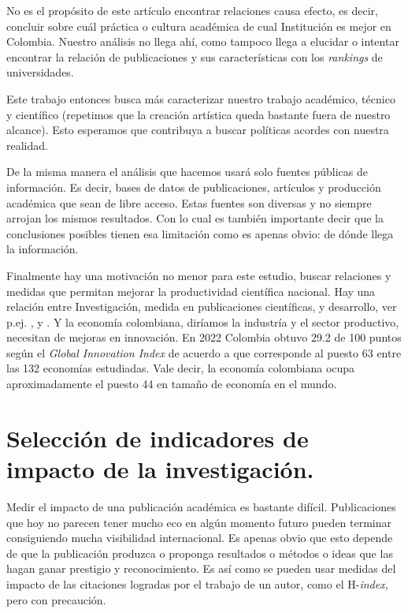 \documentclass[
11pt, %
letter, %
oneside, %
]{article} %
\begin{document}
No es el propósito de este artículo encontrar relaciones causa efecto, es decir, concluir sobre cuál práctica o cultura académica de cual Institución es mejor en Colombia. Nuestro análisis no llega ahí, como tampoco llega a elucidar o intentar encontrar la relación de publicaciones y sus características con los \textit{rankings} de universidades. 

Este trabajo entonces busca más caracterizar nuestro trabajo académico, técnico y científico (repetimos que la creación artística queda bastante fuera de nuestro alcance). Esto esperamos que contribuya a buscar políticas acordes con nuestra realidad. 

De la misma manera el análisis que hacemos usará solo fuentes públicas de información. Es decir, bases de datos de publicaciones, artículos y producción académica que sean de libre acceso. Estas fuentes son diversas y no siempre arrojan los mismos resultados. Con lo cual es también importante decir que la conclusiones posibles tienen esa limitación como es apenas obvio: de dónde llega la información. 

Finalmente hay una motivación no menor para este estudio, buscar relaciones y medidas que permitan mejorar la productividad científica nacional. Hay una relación entre Investigación, medida en publicaciones científicas, y desarrollo, ver p.ej. \cite{ekolu}, \cite{luong} y \cite{celeste}. Y la economía colombiana, diríamos la industría y el sector productivo, necesitan de mejoras en innovación.  En 2022 Colombia obtuvo 29.2 de 100 puntos según el \textit{Global Innovation Index} de acuerdo a \cite{statista} que corresponde al puesto 63 entre las 132 economías estudiadas. Vale decir, la economía colombiana ocupa aproximadamente el puesto 44 en tamaño de economía en el mundo. 

\section{Selección de indicadores de impacto de la investigación.}

Medir el impacto de una publicación académica es bastante difícil. Publicaciones que hoy no parecen tener mucho eco en algún momento futuro pueden terminar consiguiendo mucha visibilidad internacional. Es apenas obvio que esto depende de que la publicación produzca o proponga resultados o métodos o ideas que las hagan ganar prestigio y reconocimiento. Es así como se pueden usar medidas del impacto de las citaciones logradas por el trabajo  de un autor, como el H-\textit{index}, pero con precaución.
\end{document}
